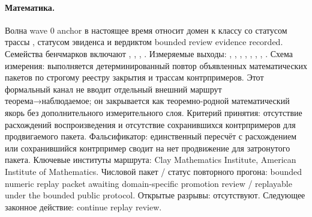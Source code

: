 \paragraph{Математика.}
Волна wave 0 anchor в настоящее время относит домен к классу  со статусом трассы , статусом эвиденса  и вердиктом bounded review evidence recorded.
Семейства бенчмарков включают , \allowbreak {}, \allowbreak {}, \allowbreak {}.
Измеряемые выходы: , \allowbreak {}, \allowbreak {}, \allowbreak {}, \allowbreak {}, \allowbreak {}, \allowbreak {}, \allowbreak {}.
Схема измерения: выполняется детерминированный повтор объявленных математических пакетов по строгому реестру закрытия и трассам контрпримеров.
Этот формальный канал не вводит отдельный внешний маршрут теорема→наблюдаемое; он закрывается как теоремно-родной математический якорь без дополнительного измерительного слоя.
Критерий принятия: отсутствие расхождений воспроизведения и отсутствие сохранившихся контрпримеров для продвигаемого пакета.
Фальсификатор: единственный пересчёт с расхождением или сохранившийся контрпример сводит на нет продвижение для затронутого пакета.
Ключевые институты маршрута: Clay Mathematics Institute, \allowbreak American Institute of Mathematics.
Числовой пакет / статус повторного прогона: bounded numeric replay packet awaiting domain-specific promotion review / replayable under the bounded public protocol.
Открытые разрывы: отсутствуют.
Следующее законное действие: continue replay review.

